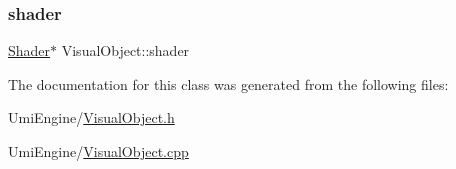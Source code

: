 \mbox{\label{class_visual_object_a6d00e06796983b19f57d6fd86b202902}} 
\subsubsection{\texorpdfstring{shader}{shader}}
{\footnotesize\ttfamily \mbox{\hyperlink{class_shader}{Shader}}$\ast$ Visual\+Object\+::shader}



The documentation for this class was generated from the following files\+:\begin{DoxyCompactItemize}
\item 
Umi\+Engine/\mbox{\hyperlink{_visual_object_8h}{Visual\+Object.\+h}}\item 
Umi\+Engine/\mbox{\hyperlink{_visual_object_8cpp}{Visual\+Object.\+cpp}}\end{DoxyCompactItemize}
